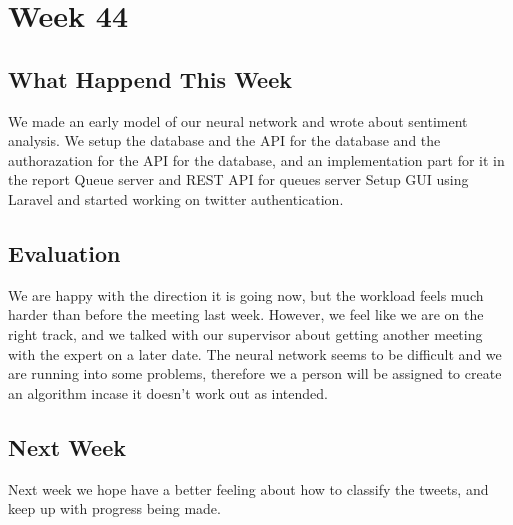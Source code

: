\section*{Week 44}
\subsection*{What Happend This Week}
We made an early model of our neural network and wrote about sentiment analysis.
We setup the database and the API for the database and the authorazation for
the API for the database, and an implementation part for it in the report 
Queue server and REST API for queues server Setup GUI using Laravel and
started working on twitter authentication.

\subsection*{Evaluation}
We are happy with the direction it is going now, but the workload feels much
harder than before the meeting last week. However, we feel like we are on the
right track, and we talked with our supervisor about getting another meeting
with the expert on a later date. The neural network seems to be difficult and we
are running into some problems, therefore we a person will be assigned to
create an algorithm incase it doesn't work out as intended.

\subsection*{Next Week}
Next week we hope have a better feeling about how to classify the tweets, and
keep up with progress being made.


